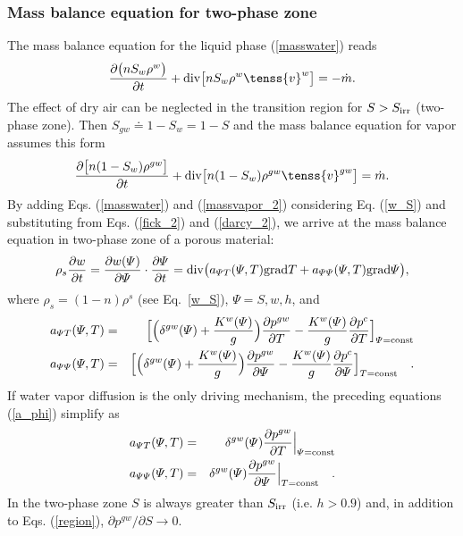 \subsubsection{Mass balance equation for two-phase zone}
\label{ssec_1_4_3}

The mass balance equation for the liquid phase (\ref{masswater}) reads 
\begin{eqnarray}
\frac{\partial \big( n S_w \rho^w\big)}{\partial t} + {\rm div} \big[n S_w \rho^w \tenss{v}^w\big]
 = -\dot{m}. \nonumber
\end{eqnarray}
The effect of dry air can be neglected in the transition region for $S > S_{\rm irr}$ (two-phase zone). 
Then $S_{gw} \doteq 1-S_{w} = 1-S$ and the mass balance equation for vapor assumes this form
\begin{eqnarray}\label{massvapor_2}
\frac{\partial \big[n(1- S_w) \rho^{gw}\big]}{\partial t} + {\rm div} \big[n (1-S_w)
\rho^{gw} \tenss{v}^{gw}\big] = \dot{m}.
\end{eqnarray}
By adding Eqs. (\ref{masswater}) and (\ref{massvapor_2}) considering Eq. (\ref{w_S}) and substituting from 
Eqs. (\ref{fick_2}) and (\ref{darcy_2}), 
we arrive at the mass balance equation in two-phase zone of a porous material:
\begin{eqnarray}\label{twophase}
\rho_s \frac{\partial w}{\partial t} = \frac{\partial w(\varPsi)}{\partial \varPsi} 
\cdot \frac{\partial \varPsi}{\partial t} = 
{\rm div} \big( a_{\varPsi T}(\varPsi, T) {\rm grad} T + a_{\varPsi \varPsi}(\varPsi, T){\rm grad} \varPsi \big),
\end{eqnarray}
where $\rho_s = (1 - n)\rho^s$ (see Eq.~\eqref{w_S}), $\varPsi = S, w, h$, and
\begin{eqnarray}\label{a_phi}
a_{\varPsi T}(\varPsi, T) &=& \Big[\Big( \delta^{gw}(\varPsi) + \frac{K^w(\varPsi)}{g} \Big) 
\frac{\partial p^{gw}}{\partial T} - \frac{K^w(\varPsi)}{g} \frac{\partial p^{c}}{\partial T} \Big]_{\varPsi = 
{\rm const}}\nonumber\\
a_{\varPsi \varPsi}(\varPsi, T) &=& \Big[\Big( \delta^{gw}(\varPsi) + \frac{K^w(\varPsi)}{g} \Big) 
\frac{\partial p^{gw}}{\partial \varPsi} - \frac{K^w(\varPsi)}{g} \frac{\partial p^{c}}{\partial \varPsi} \Big]_{T = 
{\rm const}}\quad .
\end{eqnarray}
If water vapor diffusion is the only driving mechanism, the preceding equations (\ref{a_phi}) simplify as
\begin{eqnarray}
a_{\varPsi T}(\varPsi, T) &=& \delta^{gw}(\varPsi) \frac{\partial p^{gw}}{\partial T}\Big|_{\varPsi = 
{\rm const}}\nonumber\\
a_{\varPsi \varPsi}(\varPsi, T) &=& \delta^{gw}(\varPsi) \frac{\partial p^{gw}}{\partial \varPsi} \Big|_{T = 
{\rm const}}\quad .
\end{eqnarray}
In the two-phase zone $S$ is always greater than $S_{\rm irr}$ (i.e. $h > 0.9$) and, in addition to Eqs. (\ref{region}), 
$\partial p^{gw}/\partial S \rightarrow 0$.%


